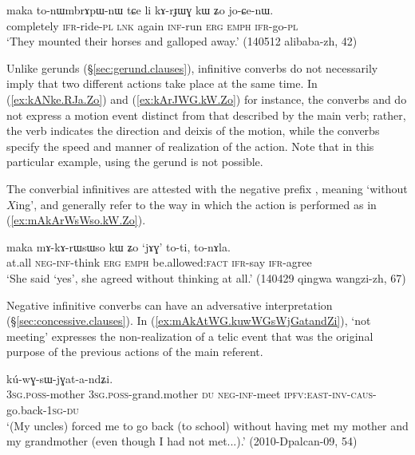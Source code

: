 \begin{exe}
\ex \label{ex:kArJWG.kW.Zo}
\gll maka to-nɯmbrɤpɯ-nɯ tɕe li kɤ-rɟɯɣ kɯ ʑo jo-ɕe-nɯ. \\
completely \textsc{ifr}-ride-\textsc{pl} \textsc{lnk} again \textsc{inf}-run \textsc{erg} \textsc{emph} \textsc{ifr}-go-\textsc{pl} \\
\glt `They mounted their horses and galloped away.' (140512 alibaba-zh, 42)
\end{exe}

Unlike gerunds (§\ref{sec:gerund.clauses}), infinitive converbs do not necessarily imply that two different actions take place at the same time. In (\ref{ex:kANke.RJa.Zo}) and (\ref{ex:kArJWG.kW.Zo}) for instance, the converbs  and  do not express a motion event distinct from that described by the main verb; rather, the verb  indicates the direction and deixis of the motion, while the converbs specify the speed and manner of realization of the action. Note that in this particular example, using the gerund is not possible.

The converbial infinitives are attested with the negative prefix , meaning `without $X$ing', and generally refer to the way in which the action is performed as in (\ref{ex:mAkArWsWso.kW.Zo}). 

\begin{exe}
\ex \label{ex:mAkArWsWso.kW.Zo}
\gll   maka mɤ-kɤ-rɯsɯso kɯ ʑo `jɤɣ' to-ti, to-nɤla. \\
at.all \textsc{neg}-\textsc{inf}-think \textsc{erg} \textsc{emph} be.allowed:\textsc{fact} \textsc{ifr}-say \textsc{ifr}-agree \\
\glt `She said `yes', she agreed without thinking at all.' (140429 qingwa wangzi-zh, 67)
\end{exe}

Negative infinitive converbs can have an adversative interpretation (§\ref{sec:concessive.clauses}). In (\ref{ex:mAkAtWG.kuwWGsWjGatandZi}),   `not meeting' expresses the non-realization of a telic event that was the original purpose of the previous actions of the main referent. 

\begin{exe}
\ex \label{ex:mAkAtWG.kuwWGsWjGatandZi}
\gll [a-mu a-wi ni mɤ-kɤ-ɤtɯɣ] kú-wɣ-sɯ-jɣat-a-ndʑi. \\
\textsc{3sg}.\textsc{poss}-mother \textsc{3sg}.\textsc{poss}-grand.mother \textsc{du} \textsc{neg}-\textsc{inf}-meet \textsc{ipfv}:\textsc{east}-\textsc{inv}-\textsc{caus}-go.back-\textsc{1sg}-\textsc{du} \\
\glt `(My uncles) forced me to go back (to school) without having met my mother and my grandmother (even though I had not met...).' (2010-Dpalcan-09, 54)
\end{exe}

